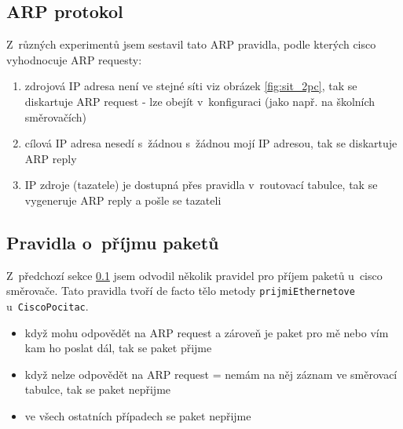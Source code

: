 

\subsection{ARP protokol} \label{arp}
\textit{} \cite{wiki:arp}

Z~různých experimentů jsem sestavil tato ARP pravidla, podle kterých cisco vyhodnocuje ARP requesty:
\begin{enumerate}
 \item zdrojová IP adresa není ve stejné síti viz obrázek \ref{fig:sit_2pc}, tak se diskartuje ARP request - lze obejít v~konfiguraci (jako např. na školních směrovačích)
 \item cílová IP adresa nesedí s~žádnou s~žádnou mojí IP adresou, tak se diskartuje ARP reply
 \item IP zdroje (tazatele) je dostupná přes pravidla v~routovací tabulce, tak se vygeneruje ARP reply a pošle se tazateli
\end{enumerate}


\subsection{Pravidla o~příjmu paketů} 
Z~předchozí sekce \ref{arp} jsem odvodil několik pravidel pro příjem paketů u~cisco směrovače. Tato pravidla tvoří de facto tělo metody \verb|prijmiEthernetove| u~\verb|CiscoPocitac|.

\begin{itemize}
 \item když mohu odpovědět na ARP request a zároveň je paket pro mě nebo vím kam ho poslat dál, tak se paket přijme
 \item když nelze odpovědět na ARP request = nemám na něj záznam ve směrovací tabulce, tak se paket nepřijme
 \item ve všech ostatních případech se paket nepřijme
\end{itemize}



